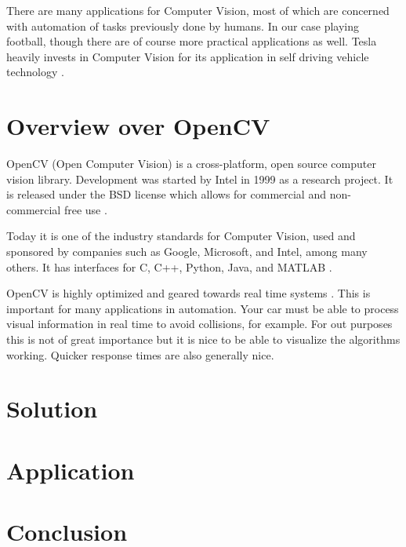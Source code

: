 \documentclass[12pt, a4paper]{article}
\begin{document}
There are many applications for Computer Vision, most of which are concerned with automation of tasks previously done by humans. In our case playing football, though there are of course more practical applications as well.
Tesla heavily invests in Computer Vision for its application in self driving vehicle technology \cite{teslaAutopilot} \cite{teslaCvArticle}.

\section{Overview over OpenCV}
OpenCV (Open Computer Vision) is a cross-platform, open source computer vision library. Development was started by Intel in 1999 as a research project. It is released under the BSD license which allows for commercial and non-commercial free use \cite{learningOpenCV}.

Today it is one of the industry standards for Computer Vision, used and sponsored by companies such as Google, Microsoft, and Intel, among many others. It has interfaces for C, C++, Python, Java, and MATLAB \cite{aboutOpenCV}.

OpenCV is highly optimized and geared towards real time systems \cite{aboutOpenCV}. This is important for many applications in automation. Your car must be able to process visual information in real time to avoid collisions, for example.
For out purposes this is not of great importance but it is nice to be able to visualize the algorithms working. Quicker response times are also generally nice.

\section{Solution}

\section{Application}

\section{Conclusion}
\end{document}
